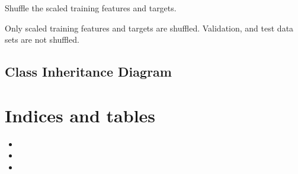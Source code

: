 \documentclass[letterpaper,10pt,english]{sphinxmanual}
\begin{document}
\begin{fulllineitems}
\begin{fulllineitems}
\end{fulllineitems}


\begin{fulllineitems}
\label{\detokenize{api/ucf.TrainingDataSets:ucf.TrainingDataSets.shuffle}}
Shuffle the scaled training features and targets.

Only scaled training features and targets are shuffled. Validation,
and test data sets are not shuffled.

\end{fulllineitems}


\end{fulllineitems}



\section{Class Inheritance Diagram}
\label{\detokenize{index:class-inheritance-diagram}}


\chapter{Indices and tables}
\label{\detokenize{index:indices-and-tables}}\begin{itemize}
\item {} 

\item {} 

\item {} 

\end{itemize}


\renewcommand{\indexname}{Python Module Index}
\begin{sphinxtheindex}
\let\bigletter\sphinxstyleindexlettergroup
\bigletter{u}
\item\relax{}
\end{sphinxtheindex}

\renewcommand{\indexname}{Index}
\printindex
\end{document}
